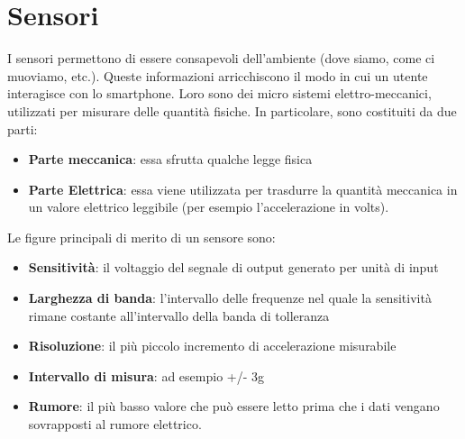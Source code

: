 \chapter{Sensori}
I sensori permettono di essere consapevoli dell'ambiente (dove siamo, come ci muoviamo, etc.). Queste informazioni arricchiscono il modo in cui un utente interagisce con lo smartphone. Loro sono dei micro sistemi elettro-meccanici, utilizzati per misurare delle quantità fisiche. In particolare, sono costituiti da due parti:
\begin{itemize}
\item \textbf{Parte meccanica}: essa sfrutta qualche legge fisica
\item \textbf{Parte Elettrica}: essa viene utilizzata per trasdurre la quantità meccanica in un valore elettrico leggibile (per esempio l'accelerazione in volts).
\end{itemize}
Le figure principali di merito di un sensore sono:
\begin{itemize}
\item \textbf{Sensitività}: il voltaggio del segnale di output generato per unità di input
\item \textbf{Larghezza di banda}: l'intervallo delle frequenze nel quale la sensitività rimane costante all'intervallo della banda di tolleranza
\item \textbf{Risoluzione}: il più piccolo incremento di accelerazione misurabile
\item \textbf{Intervallo di misura}: ad esempio +/- 3g
\item \textbf{Rumore}: il più basso valore che può essere letto prima che i dati vengano sovrapposti al rumore elettrico.
\end{itemize}

